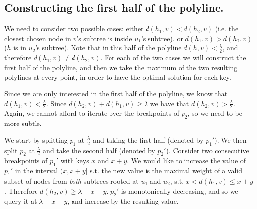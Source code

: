 \documentclass[a4paper,UKenglish]{lipics-v2016}
\theoremstyle{plain}
\begin{document}

\subsection{Constructing the first half of the polyline.} We need to consider two possible cases: either $d(h_1,v) < d(h_2,v)$ (i.e. the closest chosen node in $v$'s subtree is inside $u_1$'s subtree), or $d(h_1,v) > d(h_2,v)$ ($h$ is in $u_2$'s subtree). Note that in this half of the polyline $d(h,v)<\frac{\lambda}{2}$, and therefore $d(h_1,v) \neq d(h_2,v)$. For each of the two cases we will construct the first half of the polyline, and then we take the maximum of the two resulting polylines at every point, in order to have the optimal solution for each key.

\vspace{0.04in}  Since we are only interested in the first half of the polyline, we know that $d(h_1,v) < \frac{\lambda}{2}$. Since $d(h_2,v) +d(h_1,v)\geq \lambda$ we have that  $d(h_2,v) > \frac{\lambda}{2}$. Again, we cannot afford to iterate over the breakpoints of $p_2$, so we need to be more subtle.

We start by splitting $p_1$ at $\frac{\lambda}{2}$ and taking the first half (denoted by $p_1'$). We then split $p_2$ at $\frac{\lambda}{2}$ %
and take the second half (denoted by $p_2'$). Consider two consecutive breakpoints of $p_1'$ with keys $x$ and $x+y$. We would like to increase the value of $p_1'$ in the interval $(x,x+y]$ s.t. the new value is the maximal weight of a valid subset of nodes from \emph{both} subtrees rooted at $u_1$ and $u_2$, s.t. $x < d(h_1,v) \leq x+y$. Therefore $d(h_2,v) \ge \lambda-x-y$. $p_2'$ is monotonically decreasing, and so we query it at $\lambda-x-y$, and increase by the resulting value. %
\end{document}
